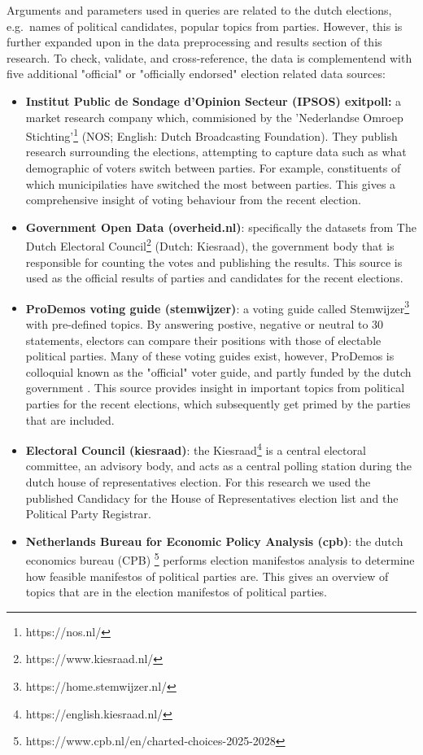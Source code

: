Arguments and parameters used in queries are related to the dutch elections, e.g.\ names of political candidates, popular topics from parties.
However, this is further expanded upon in the data preprocessing and results section of this research.
To check, validate, and cross-reference, the data is complementend with five additional "official" or "officially endorsed" election related data sources: 
\begin{itemize}
  \item \textbf{Institut Public de Sondage d'Opinion Secteur (IPSOS) exitpoll:} a market research company which, commisioned by the 'Nederlandse Omroep Stichting'\footnote{https://nos.nl/} (NOS; English: Dutch Broadcasting Foundation).
  They publish research surrounding the elections, attempting to capture data such as what demographic of voters switch between parties.
  For example, constituents of which municipilaties have switched the most between parties\cite{nos}. 
  This gives a comprehensive insight of voting behaviour from the recent election.
  \item \textbf{Government Open Data (overheid.nl)}: specifically the datasets from The Dutch Electoral Council\footnote{https://www.kiesraad.nl/} (Dutch: Kiesraad), the government body that is responsible for counting the votes and publishing the results\cite{kiesraad}.
  This source is used as the official results of parties and candidates for the recent elections.
  \item \textbf{ProDemos voting guide (stemwijzer)}: a voting guide called Stemwijzer\footnote{https://home.stemwijzer.nl/} with pre-defined topics.
  By answering postive, negative or neutral to 30 statements, electors can compare their positions with those of electable political parties.
  Many of these voting guides exist, however, ProDemos is colloquial known as the "official" voter guide, and partly funded by the dutch government \cite{prodemos}. 
  This source provides insight in important topics from political parties for the recent elections, which subsequently get primed by the parties that are included.
  \item \textbf{Electoral Council (kiesraad)}: the Kiesraad\footnote{https://english.kiesraad.nl/} is a central electoral committee, an advisory body, and acts as a central polling station during the dutch house of representatives election.
  For this research we used the published Candidacy for the House of Representatives election list and the Political Party Registrar.
  \item \textbf{Netherlands Bureau for Economic Policy Analysis (cpb)}: the dutch economics bureau (CPB) \footnote{https://www.cpb.nl/en/charted-choices-2025-2028} performs election manifestos analysis to determine how feasible manifestos of political parties are.
  This gives an overview of topics that are in the election manifestos of political parties.
\end{itemize}

